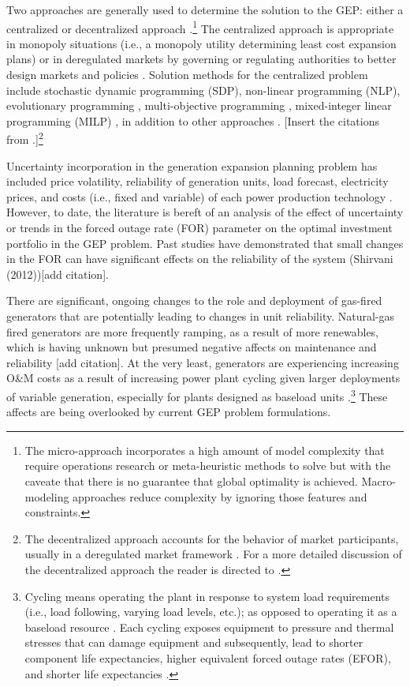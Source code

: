\documentclass[10pt]{amsart}
\begin{document}
Two approaches are generally used to determine the solution to the GEP: either a centralized or decentralized approach \parencite{bakirtzis:2012aa}.\footnote{The micro-approach incorporates a high amount of model complexity that require operations research or meta-heuristic methods to solve but with the caveate that there is no guarantee that global optimality is achieved. Macro-modeling approaches reduce complexity by ignoring those features and constraints.} 
The centralized approach is appropriate in monopoly situations (i.e., a monopoly utility determining least cost expansion plans) or in deregulated markets by governing or regulating authorities to better design markets and policies \parencite{bakirtzis:2012aa}.
Solution methods for the centralized problem include stochastic dynamic programming (SDP)\parencite{}, non-linear programming (NLP)\parencite{}, evolutionary programming \parencite{}, multi-objective programming \parencite{}, mixed-integer linear programming (MILP) \parencite{}, in addition to other approaches \parencite{}\parencite{bakirtzis:2012aa}.  
[Insert the citations from \cite{bakirtzis:2012aa}.]\footnote{The decentralized approach accounts for the behavior of market participants, usually in a deregulated market framework \parencite{bakirtzis:2012aa}. 
For a more detailed discussion of the decentralized approach the reader is directed to \cite{bakirtzis:2012aa}.} 

Uncertainty incorporation in the generation expansion planning problem has included price volatility, reliability of generation units, load forecast, electricity prices, and costs (i.e., fixed and variable) of each power production technology \cite{hemmati:2013ab, pereira2010decision, pereira2011generation}. 
However, to date, the literature is bereft of an analysis of the effect of uncertainty or trends in the forced outage rate (FOR) parameter on the optimal investment portfolio in the GEP problem. 
Past studies have demonstrated that small changes in the FOR can have significant effects on the reliability of the system \parencite{} (Shirvani (2012))[add citation]. 

There are significant, ongoing changes to the role and deployment of gas-fired generators that are potentially leading to changes in unit reliability. 
Natural-gas fired generators are more frequently ramping, as a result of more renewables, which is having unknown but presumed negative affects on maintenance and reliability [add citation].
At the very least, generators are experiencing increasing O\&M costs as a result of increasing power plant cycling given larger deployments of variable generation, especially for plants designed as baseload units \parencite{nrel:2012aa}.\footnote{Cycling means operating the plant in response to system load requirements (i.e., load following, varying load levels, etc.); as opposed to operating it as a baseload resource \parencite{nerc:2012aa}. Each cycling exposes equipment to pressure and thermal stresses that can damage equipment and subsequently, lead to shorter component life expectancies, higher equivalent forced outage rates (EFOR), and shorter life expectancies \parencite{nerc:2012aa}.} 
These affects are being overlooked by current GEP problem formulations.
\end{document}
